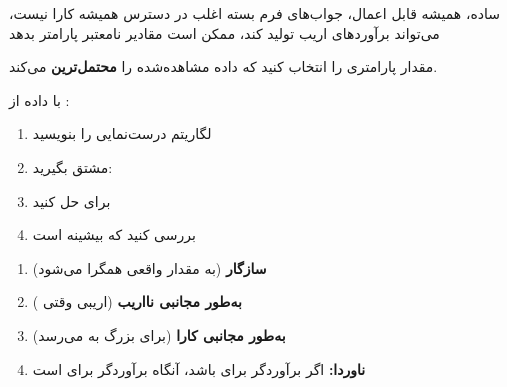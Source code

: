 
\lr{\mbox{\PSyes{}}} ساده، همیشه قابل اعمال، جواب‌های فرم بسته اغلب در دسترس\PSbr{}\lr{\mbox{\PSno{}}} همیشه کارا نیست، می‌تواند برآوردهای اریب تولید کند، ممکن است مقادیر نامعتبر پارامتر بدهد



مقدار پارامتری را انتخاب کنید که داده مشاهده‌شده را \textbf{محتمل‌ترین} می‌کند.


با داده  از :





\begin{enumerate}
\def\labelenumi{\arabic{enumi}.}
\tightlist
\item
  لگاریتم درست‌نمایی \lr{$\ell (\theta)$} را بنویسید
\item
  مشتق بگیرید: 
\item
  برای  حل کنید
\item
  بررسی کنید که بیشینه است 
\end{enumerate}


\begin{enumerate}
\def\labelenumi{\arabic{enumi}.}
\tightlist
\item
  \textbf{سازگار} (به مقدار واقعی همگرا می‌شود)
\item
  \textbf{به‌طور مجانبی نااریب} (اریبی  وقتی )
\item
  \textbf{به‌طور مجانبی کارا} (برای  بزرگ به  می‌رسد)
\item
  \textbf{ناوردا:} اگر \lr{$\hat{\theta}$} برآوردگر  برای \lr{$\theta$} باشد، آنگاه  برآوردگر  برای  است
\end{enumerate}

